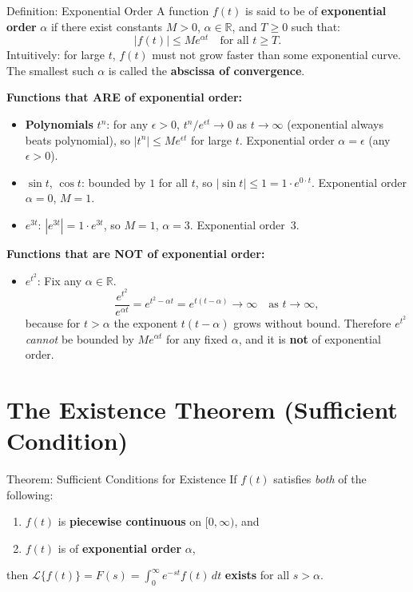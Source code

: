 \documentclass[12pt,a4paper]{article}
\begin{document}
\begin{infobox}{Definition: Exponential Order}
A function $f(t)$ is said to be of \textbf{exponential order} $\alpha$ if there exist constants
$M > 0$, $\alpha \in \mathbb{R}$, and $T \geq 0$ such that:
\[
  |f(t)| \leq M e^{\alpha t} \quad \text{for all } t \geq T.
\]
Intuitively: for large $t$, $f(t)$ must not grow faster than some exponential curve.
The smallest such $\alpha$ is called the \textbf{abscissa of convergence}.
\end{infobox}

\medskip
\noindent\textbf{Functions that ARE of exponential order:}

\begin{itemize}
  \item \textbf{Polynomials} $t^n$: for any $\epsilon > 0$,
        $t^n / e^{\epsilon t} \to 0$ as $t \to \infty$
        (exponential always beats polynomial), so $|t^n| \leq M e^{\epsilon t}$
        for large $t$. Exponential order $\alpha = \epsilon$ (any $\epsilon > 0$).
  \item $\sin t$, $\cos t$: bounded by $1$ for all $t$, so $|{\sin t}| \leq 1 = 1 \cdot e^{0 \cdot t}$.
        Exponential order $\alpha = 0$, $M = 1$.
  \item $e^{3t}$: $|e^{3t}| = 1 \cdot e^{3t}$, so $M = 1$, $\alpha = 3$. Exponential order~$3$.
\end{itemize}

\medskip
\noindent\textbf{Functions that are NOT of exponential order:}

\begin{itemize}
  \item $e^{t^2}$: Fix any $\alpha \in \mathbb{R}$.
        \[
          \frac{e^{t^2}}{e^{\alpha t}} = e^{t^2 - \alpha t} = e^{t(t - \alpha)} \to \infty
          \quad \text{as } t \to \infty,
        \]
        because for $t > \alpha$ the exponent $t(t-\alpha)$ grows without bound.
        Therefore $e^{t^2}$ \emph{cannot} be bounded by $M e^{\alpha t}$ for any fixed $\alpha$,
        and it is \textbf{not} of exponential order.
\end{itemize}

\section{The Existence Theorem (Sufficient Condition)}

\begin{infobox}{Theorem: Sufficient Conditions for Existence}
If $f(t)$ satisfies \emph{both} of the following:
\begin{enumerate}
  \item $f(t)$ is \textbf{piecewise continuous} on $[0, \infty)$, and
  \item $f(t)$ is of \textbf{exponential order} $\alpha$,
\end{enumerate}
then $\mathcal{L}\{f(t)\} = F(s) = \int_0^\infty e^{-st} f(t)\, dt$ \textbf{exists} for all
$s > \alpha$.
\end{infobox}
\end{document}
